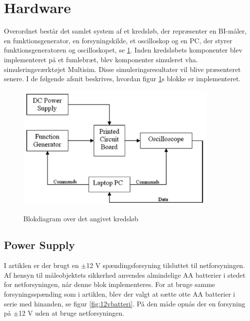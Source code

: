 \section{Hardware}

Overordnet består det samlet system af et kredsløb, der repræsenter en BI-måler, en funktionsgenerator, en forsyningskilde, et oscilloskop og en PC, der styrer funktionsgeneratoren og oscilloskopet, se \ref{fig:oprindeligebd}. Inden kredsløbets komponenter blev implementeret på et fumlebræt, blev komponenter simuleret vha. simuleringsværktøjet Multisim. Disse simuleringsresultater vil blive præsenteret senere. I de følgende afsnit beskrives, hvordan figur  \ref{fig:oprindeligebd}s blokke er implementeret. 

\begin{figure}[H]
\centering
{\includegraphics[width=10cm]
{Figure/oprindeligebd}}
\caption{Blokdiagram over det angivet kredsløb \cite{Aroom2009}}
\label{fig:oprindeligebd}
\end{figure}

\pagebreak

\subsection{Power Supply}
I artiklen er der brugt en $\pm$12 V spændingsforsyning tilsluttet til netforsyningen. Af hensyn til måleobjektets sikkerhed anvendes almindelige AA batterier i stedet for netforsyningen, når denne blok implementeres. For at bruge samme forsyningsspænding som i artiklen, blev der valgt at sætte otte AA batterier i serie med hinanden, se figur \ref{fig:12vbatteri}. På den måde opnås der en forsyning på $\pm$12 V uden at bruge netforsyningen.

